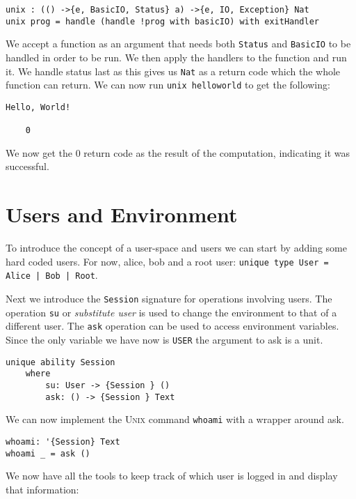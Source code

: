 \documentclass[logo,bsc,singlespacing,parskip]{infthesis}
\begin{document}
\begin{lstlisting}[language=unison]
unix : (() ->{e, BasicIO, Status} a) ->{e, IO, Exception} Nat
unix prog = handle (handle !prog with basicIO) with exitHandler
\end{lstlisting}

We accept a function as an argument that needs both \texttt{Status} and
\texttt{BasicIO} to be handled in order to be run. We then apply the handlers
to the function and run it. We handle status last as this gives us \texttt{Nat}
as a return code which the whole function can return. We can now run
\texttt{unix helloworld} to get the following:

\begin{lstlisting}[language=unison]
  Hello, World!

    0
\end{lstlisting}

We now get the 0 return code as the result of the computation, indicating it was successful.

\section{Users and Environment}

To introduce the concept of a user-space and users we can start by adding some
hard coded users. For now, alice, bob and a root user: \texttt{unique type User
= Alice | Bob | Root}.

Next we introduce the \texttt{Session} signature for operations involving
users. The operation \texttt{su} or \emph{substitute user} is used to change
the environment to that of a different user. The \texttt{ask} operation can be
used to access environment variables. Since the only variable we have now is
\texttt{USER} the argument to ask is a unit.

\begin{lstlisting}[language=unison]
unique ability Session
    where
        su: User -> {Session } ()
        ask: () -> {Session } Text
\end{lstlisting}

We can now implement the \textsc{Unix} command \texttt{whoami} with a wrapper
around ask.

\begin{lstlisting}[language=unison]
whoami: '{Session} Text
whoami _ = ask ()
\end{lstlisting}

We now have all the tools to keep track of which user is logged in and display
that information:
\end{document}
